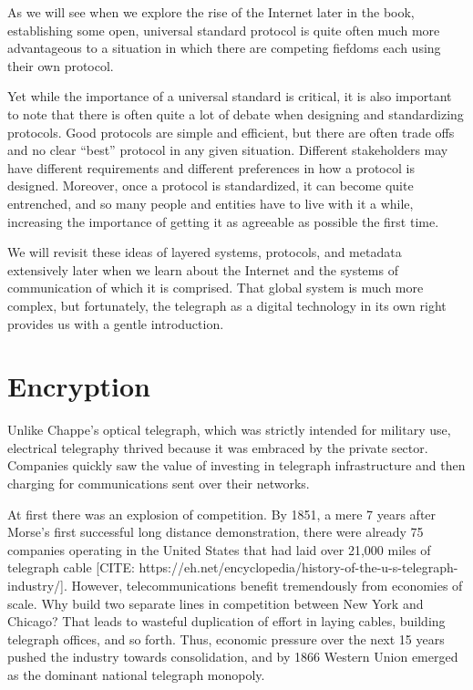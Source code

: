\documentclass[UTF8]{book}
\begin{document}
\begin{CJK}{UTF8}{gbsn}
As we will see when we explore the rise of the Internet later in the book, establishing some open, universal standard protocol is quite often much more advantageous to a situation in which there are competing fiefdoms each using their own protocol.

Yet while the importance of a universal standard is critical, it is also important to note that there is often quite a lot of debate when designing and standardizing protocols. Good protocols are simple and efficient, but there are often trade offs and no clear ``best'' protocol in any given situation. Different stakeholders may have different requirements and different preferences in how a protocol is designed. Moreover, once a protocol is standardized, it can become quite entrenched, and so many people and entities have to live with it a while, increasing the importance of getting it as agreeable as possible the first time.

We will revisit these ideas of layered systems, protocols, and metadata extensively later when we learn about the Internet and the systems of communication of which it is comprised. That global system is much more complex, but fortunately, the telegraph as a digital technology in its own right provides us with a gentle introduction.

\section{Encryption}

Unlike Chappe's optical telegraph, which was strictly intended for military use, electrical telegraphy thrived because it was embraced by the private sector. Companies quickly saw the value of investing in telegraph infrastructure and then charging for communications sent over their networks.

At first there was an explosion of competition. By 1851, a mere 7 years after Morse's first successful long distance demonstration, there were already 75 companies operating in the United States that had laid over 21,000 miles of telegraph cable [CITE: https://eh.net/encyclopedia/history-of-the-u-s-telegraph-industry/]. However, telecommunications benefit tremendously from economies of scale. Why build two separate lines in competition between New York and Chicago? That leads to wasteful duplication of effort in laying cables, building telegraph offices, and so forth. Thus, economic pressure over the next 15 years pushed the industry towards consolidation, and by 1866 Western Union emerged as the dominant national telegraph monopoly.


\end{CJK}
\end{document}
